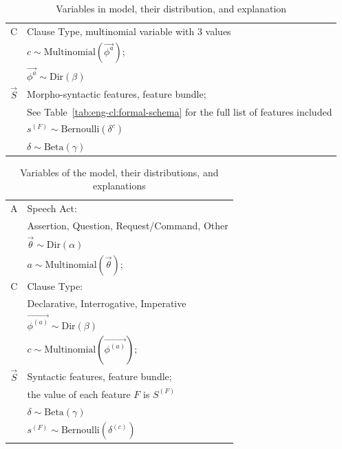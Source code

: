 \begin{table}[H]
    \centering
    \begin{tabular}{c|l}
    \hline
    \hline
        C &  Clause Type, multinomial variable with 3 values\\
        & $ c \sim  \mbox{Multinomial}(\vec{\phi^{a}})$;\\
        &$\vec{\phi^{a}} \sim \mbox{Dir}(\beta)$\\
\hline
        $\vec{S}$ &  Morpho-syntactic features, feature bundle; \\
        & See Table~\ref{tab:eng-cl:formal-schema} for the full list of features included \\
        & $s^{(F)} \sim \mbox{Bernoulli}(\delta^{c})$ \\
        &$\delta\sim \mbox{Beta}(\gamma)$\\
    \hline
    \hline
    \end{tabular}
    \caption{Variables in \distlearner{} model, their distribution, and explanation}
    \label{tab:engcl:baseline-variables}
\end{table}


\begin{table}[H]
    \centering
    \begin{tabular}{c|l}
    \hline
    \hline
        A & Speech Act: \\
        	  &Assertion, Question, Request/Command, Other\\
          & $\vec{\theta} \sim \mbox{Dir}(\alpha)$\\
          & $ a \sim \mbox{Multinomial}(\vec{\theta})$;\\

\hline
        C &  Clause Type:\\
        & Declarative, Interrogative, Imperative\\
        &$\vec{\phi^{(a)}} \sim \mbox{Dir}(\beta)$\\
        & $ c \sim  \mbox{Multinomial}(\vec{\phi^{(a)}})$;\\
\hline
        $\vec{S}$ &  Syntactic features, feature bundle; \\
        & the value of each feature $F$ is $S^{(F)}$ \\
        &$\delta\sim \mbox{Beta}(\gamma)$\\        
        & $s^{(F)} \sim \mbox{Bernoulli}(\delta^{(c)})$ \\
    \hline
    \hline
    \end{tabular}
    \caption{Variables of the \praglearner{} model, their distributions, and explanations}
    \label{tab:engcl:target-variables}
\end{table}


